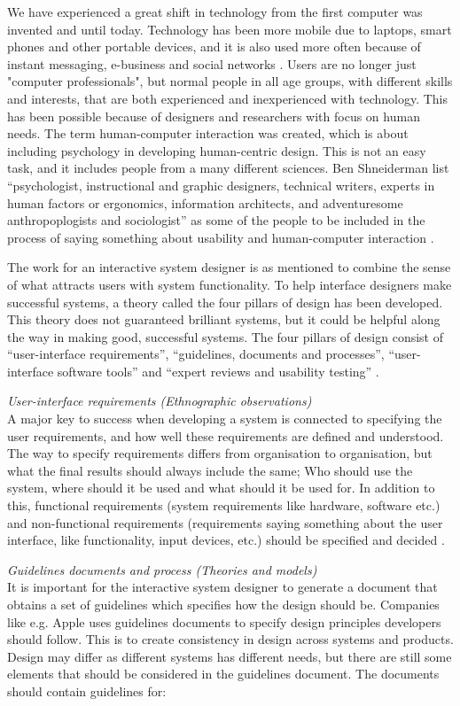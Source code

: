 We have experienced a great shift in technology from the first computer was invented and until today. Technology has been more mobile due to laptops, smart phones and other portable devices, and it is also used more often because of instant messaging, e-business and social networks \cite{mmi}. Users are no longer just "computer professionals", but normal people in all age groups, with different skills and interests, that are both experienced and inexperienced with technology. This has been possible because of designers and researchers with focus on human needs. The term human-computer interaction was created, which is about including psychology in developing human-centric design. This is not an easy task, and it includes people from a many different sciences. Ben Shneiderman list “psychologist, instructional and graphic designers, technical writers, experts in human factors or ergonomics, information architects, and adventuresome anthropoplogists and sociologist” as some of the people to be included in the process of saying something about usability and human-computer interaction \cite{mmi}.    

The work for an interactive system designer is as mentioned to combine the sense of what attracts users with system functionality. To help interface designers make successful systems, a theory called the four pillars of design has been developed. This theory does not guaranteed brilliant systems, but it could be helpful along the way in making good, successful systems. The four pillars of design consist of “user-interface requirements”, “guidelines, documents and processes”, “user-interface software tools” and “expert reviews and usability testing” \cite{mmi}.    

\emph{User-interface requirements (Ethnographic observations)}\\
A major key to success when developing a system is connected to specifying the user requirements, and how well these requirements are defined and understood.  The way to specify requirements differs from organisation to organisation, but what the final results should always include the same; Who should use the system, where should it be used and what should it be used for. In addition to this, functional requirements (system requirements like hardware,  software etc.) and non-functional requirements (requirements saying something about the user interface, like functionality, input devices, etc.) should be specified and decided \cite{mmi}.


\emph{Guidelines documents and process (Theories and models)}\\
It is important for the interactive system designer to generate a document that obtains a set of guidelines which specifies how the design should be. Companies like e.g. Apple uses guidelines documents to specify design principles developers should follow. This is to create consistency in design across systems and products. Design may differ as different systems has different needs, but there are still some elements that should be considered in the guidelines document. The documents should contain guidelines for:

